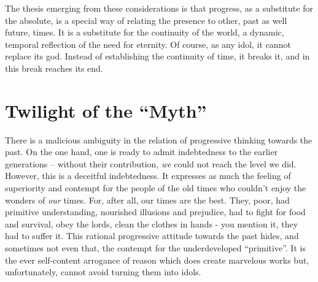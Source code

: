 The thesis emerging from these considerations is that progress, as a substitute
for the absolute, is a special way of relating the presence to other, past
as well future, times. It is a substitute for the continuity of the world,
a dynamic, temporal reflection of the need for eternity. Of course, as any
idol, it cannot replace its god. Instead of establishing the continuity of
time, it breaks it, and in this break reaches its end.

\section{Twilight of the ``Myth''}
There is a malicious ambiguity in the relation of progressive thinking towards
 the past. On the one hand, one is ready to admit indebtedness
to the earlier generations -- without their contribution, {\em we} could not
reach the level we did. However, this is a deceitful indebtedness. It expresses
as much the feeling of superiority and contempt for the people of the old
times who couldn't enjoy the wonders of {\em our} times. For, after all,
our times are the best. They, poor, had primitive understanding, nourished 
illusions and prejudice, had to fight for food and survival, obey the lords, 
clean the clothes in hands - you mention it, they had to suffer it. This
rational progressive attitude towards the past hides, and sometimes not even 
that, the contempt for the underdeveloped ``primitive''. It is the ever 
self-content arrogance of reason which does create marvelous works but,
unfortunately, cannot avoid turning them into idols.

